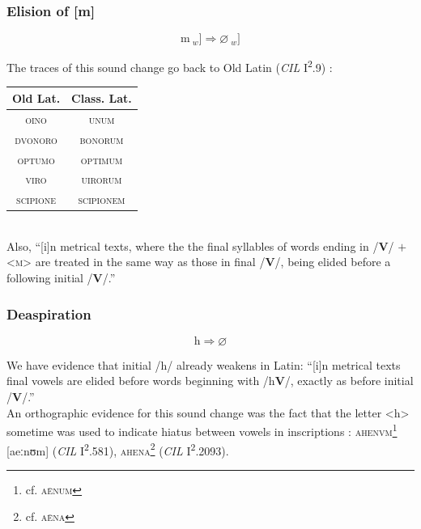 \documentclass{report}[12pt]
\begin{document}
\subsubsection{Elision of [m]}\label{sec:m_elision}

\begin{tcolorbox}
  \[ \text{m}\ _w] \Rightarrow \varnothing\ _w] \]
\end{tcolorbox}

The traces of this sound change go back to Old Latin (\emph{CIL} I\textsuperscript{2}.9) \parencite[p.~17]{companion_to_latin}: \\
\begin{tabular}{c c}
  Old Lat. & Class. Lat. \\
  \hline
  \textsc{oino} & \textsc{unum} \\
  \textsc{dvonoro} & \textsc{bonorum} \\
  \textsc{optumo} & \textsc{optimum} \\
  \textsc{viro} & \textsc{uirorum} \\
  \textsc{scipione} & \textsc{scipionem} \\
\end{tabular} \\
Also, ``[i]n metrical texts, where the the final syllables of words ending in /\textbf{V}/ $+$ <\textsc{m}> are treated in the same way as those in final /\textbf{V}/, being elided before a following initial /\textbf{V}/.'' \parencite[p.~87]{companion_to_latin}

\subsubsection{Deaspiration}

\begin{tcolorbox}
  \[ \text{h} \Rightarrow \varnothing \]
\end{tcolorbox}

We have evidence that initial /h/ already weakens in Latin: ``[i]n metrical texts final vowels are elided before words beginning with /h\textbf{V}/, exactly as before initial /\textbf{V}/.'' \parencite[p.~87]{companion_to_latin} \\
An orthographic evidence for this sound change was the fact that the letter <h> sometime was used to indicate hiatus between vowels in inscriptions \parencite[p.~18]{companion_to_latin}: \textsc{ahenvm}\footnote{cf. \textsc{a\={e}num}} [aeːnʊm] (\emph{CIL} I\textsuperscript{2}.581), \textsc{ahena}\footnote{cf. \textsc{a\={e}na}} (\emph{CIL} I\textsuperscript{2}.2093).
\end{document}
